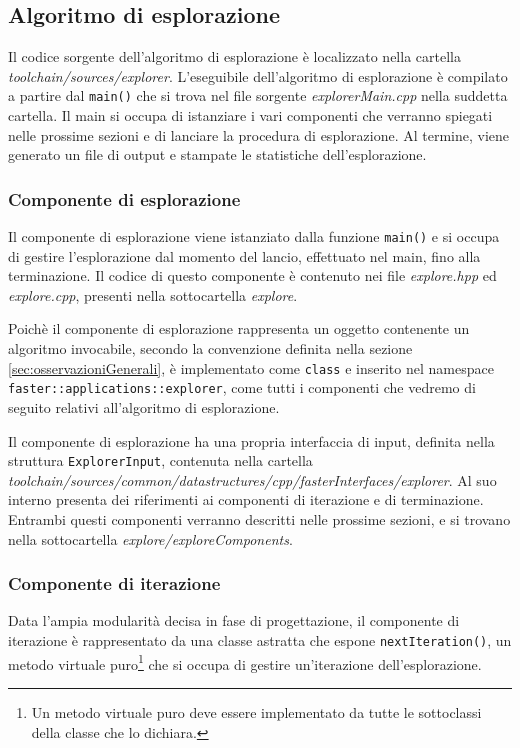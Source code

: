 \subsection{Algoritmo di esplorazione}
\label{subsec:algoritmoEsplorazione}
Il codice sorgente dell'algoritmo di esplorazione è localizzato nella cartella 
\emph{toolchain/sources/explorer}. L'eseguibile dell'algoritmo di esplorazione 
è compilato a partire dal \verb+main()+ che si trova nel file sorgente 
\emph{explorerMain.cpp} nella suddetta cartella. Il main si occupa di 
istanziare i vari componenti che verranno spiegati nelle prossime sezioni e di 
lanciare la procedura di esplorazione. Al termine, viene generato un file di 
output e stampate le statistiche dell'esplorazione.

\subsubsection{Componente di esplorazione}
Il componente di esplorazione viene istanziato dalla funzione \verb+main()+ e 
si occupa di gestire l'esplorazione dal momento del lancio, effettuato nel main, 
fino alla terminazione. Il codice di questo componente è contenuto nei file 
\emph{explore.hpp} ed \emph{explore.cpp}, presenti nella sottocartella 
\emph{explore}.

Poichè il componente di esplorazione rappresenta un oggetto contenente un 
algoritmo invocabile, secondo la convenzione definita nella sezione
\ref{sec:osservazioniGenerali}, è implementato come \verb+class+ e 
inserito nel namespace \verb+faster::applications::explorer+, come tutti i 
componenti che vedremo di seguito relativi all'algoritmo di esplorazione.

Il componente di esplorazione ha una propria interfaccia di input, definita 
nella struttura \verb+ExplorerInput+, contenuta nella cartella 
\emph{toolchain/sources/common/datastructures/cpp/fasterInterfaces/explorer}. 
Al suo interno presenta dei riferimenti ai componenti di iterazione e di 
terminazione. Entrambi questi componenti verranno descritti nelle prossime 
sezioni, e si trovano nella sottocartella \emph{explore/exploreComponents}.

\subsubsection{Componente di iterazione}
Data l'ampia modularità decisa in fase di progettazione, il componente di 
iterazione è rappresentato da una classe astratta che espone 
\verb+nextIteration()+, un metodo virtuale puro\footnote{Un metodo virtuale 
puro deve essere implementato da tutte le sottoclassi della classe che lo 
dichiara.} che si occupa di gestire un'iterazione dell'esplorazione.

